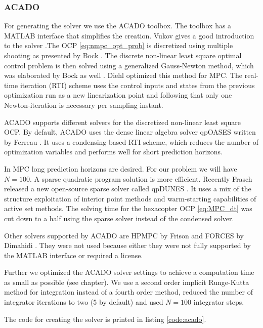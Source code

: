 \subsubsection{ACADO}
For generating the solver we use the ACADO toolbox. The toolbox has a MATLAB interface that simplifies the creation. Vukov gives a good introduction to the solver \cite{Vukov2013}.The OCP \ref{eq:nmpc_opt_prob} is discretized using multiple shooting as presented by Bock \cite{bock1984multiple}. The discrete non-linear least square optimal control problem is then solved using a generalized Gauss-Newton method, which was elaborated by Bock as well \cite{Bock1983}. Diehl optimized this method for MPC. The real-time iteration (RTI) scheme \cite{Diehl2005} uses the control inputs and states from the previous optimization run as a new linearization point and following that only one Newton-iteration is necessary per sampling instant.

ACADO supports different solvers for the discretized non-linear least square OCP. By default, ACADO uses the dense linear algebra solver qpOASES written by Ferreau \cite{Ferreau2014}. It uses a condensing based RTI scheme, which reduces the number of optimization variables and performs well for short prediction horizons.

In MPC long prediction horizons are desired. For our problem we will have $N=100$. A sparse quadratic program solution is more efficient. Recently Frasch released a new open-source sparse solver called qpDUNES \cite{Frasch}. It uses a mix of the structure exploitation of interior point methods and warm-starting capabilities of active set methods. The solving time for the hexacopter OCP \ref{eq:MPC_dt} was cut down to a half using the sparse solver instead of the condensed solver.

Other solvers supported by ACADO are HPMPC by Frison \cite{www:hpmpc} and FORCES by Dimahidi \cite{www:forces}. They were not used because either they were not fully supported by the MATLAB interface or required a license.

Further we optimized the ACADO solver settings to achieve a computation time as small as possible (see chapter). We use a second order implicit Runge-Kutta method for integration instead of a fourth order method, reduced the number of integrator iterations to two (5 by default) and used $N=100$ integrator steps.

The code for creating the solver is printed in listing \ref{code:acado}.
